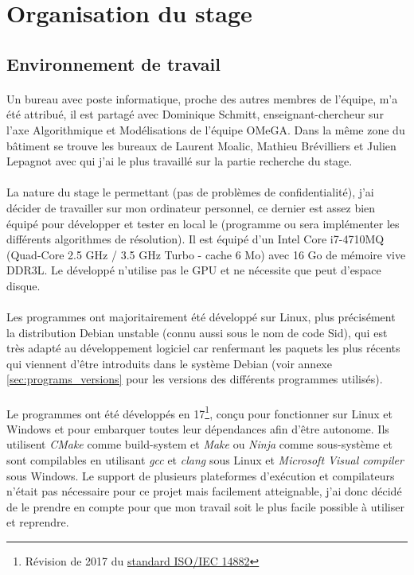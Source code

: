 \documentclass[a4paper,11pt,twoside,french,report]{../common/simplem}
\begin{document}
		\section{Organisation du stage}
			\subsection{Environnement de travail}
				\paragraph*{}
					Un bureau avec poste informatique, proche des autres membres de l'équipe, m'a été attribué, il est partagé avec Dominique Schmitt, enseignant-chercheur sur l'axe Algorithmique et Modélisations de l'équipe \gls{OMeGA}. Dans la même zone du bâtiment se trouve les bureaux de Laurent Moalic, Mathieu Brévilliers et Julien Lepagnot avec qui j'ai le plus travaillé sur la partie recherche du stage.
				\paragraph*{}
					La nature du stage le permettant (pas de problèmes de confidentialité), j'ai décider de travailler sur mon ordinateur personnel, ce dernier est assez bien équipé pour développer et tester en local le \solver{} (programme ou sera implémenter les différents algorithmes de résolution). Il est équipé d'un Intel Core i7-4710MQ (Quad-Core 2.5 GHz / 3.5 GHz Turbo - cache 6 Mo) avec 16 Go de mémoire vive DDR3L. Le \solver{} développé n'utilise pas le GPU et ne nécessite que peut d'espace disque.
				\paragraph*{}
					Les programmes ont majoritairement été développé sur Linux, plus précisément la distribution Debian unstable (connu aussi sous le nom de code Sid), qui est très adapté au développement logiciel car renfermant les paquets les plus récents qui viennent d'être introduits dans le système Debian (voir annexe \ref{sec:programs_versions} pour les versions des différents programmes utilisés).
				\paragraph*{}
					Le programmes ont été développés en \Cpp{}17\footnote{Révision de 2017 du \href{https://www.iso.org/standard/68564.html}{standard ISO/IEC 14882}}, conçu pour fonctionner sur Linux et Windows et pour embarquer toutes leur dépendances afin d’être autonome. Ils utilisent \textit{CMake} comme build-system et \textit{Make} ou \textit{Ninja} comme sous-système et sont compilables en utilisant \textit{gcc} et \textit{clang} sous Linux et \textit{Microsoft Visual \Cpp{} compiler} sous Windows. Le support de plusieurs plateformes d'exécution et compilateurs n'était pas nécessaire pour ce projet mais facilement atteignable, j'ai donc décidé de le prendre en compte pour que mon travail soit le plus facile possible à utiliser et reprendre.
\end{document}
